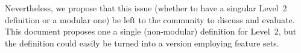 \documentclass[10pt]{cekarticle}
\begin{document}
Nevertheless, we propose that this issue (whether to have a singular
Level~2 definition or a modular one) be left to the community to discuss
and evaluate.  This document proposes one a single (non-modular) definition
for Level~2, but the definition could easily be turned into a version
employing feature sets.








\end{document}
